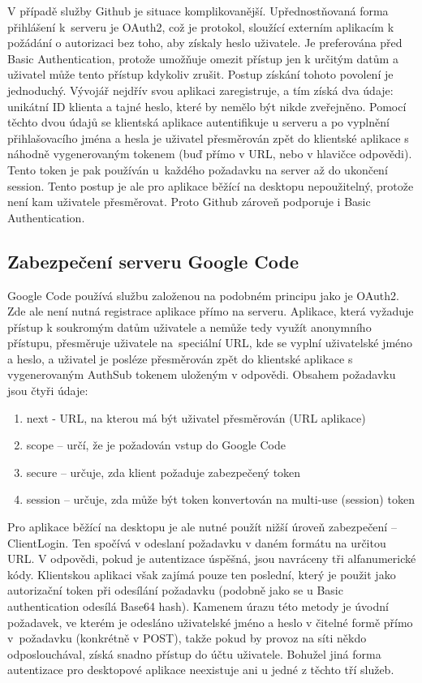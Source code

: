 V případě služby Github je situace komplikovanější\cite{github:summary}. Upřednostňovaná forma přihlášení k~serveru je OAuth2\cite{github:oauth}, což je protokol, sloužící externím aplikacím k požádání o autorizaci bez toho, aby získaly heslo uživatele. Je preferována před Basic Authentication, protože umožňuje omezit přístup jen k určitým datům a uživatel může tento přístup kdykoliv zrušit. Postup získání tohoto povolení je jednoduchý. Vývojář nejdřív svou aplikaci zaregistruje, a tím získá dva údaje: unikátní ID klienta a tajné heslo, které by nemělo být nikde zveřejněno. Pomocí těchto dvou údajů se klientská aplikace autentifikuje u serveru a po vyplnění přihlašovacího jména a hesla je uživatel přesměrován zpět do klientské aplikace s náhodně vygenerovaným tokenem (buď přímo v URL, nebo v hlavičce odpovědi). Tento token je pak používán u~každého požadavku na server až do ukončení session. Tento postup je ale pro aplikace běžící na desktopu nepoužitelný, protože není kam uživatele přesměrovat. Proto Github zároveň podporuje i Basic Authentication.

\subsection{Zabezpečení serveru Google Code}

Google Code používá službu\cite{googleauth} založenou na podobném principu jako je OAuth2. Zde ale není nutná registrace aplikace přímo na serveru. Aplikace, která vyžaduje přístup k soukromým datům uživatele a nemůže tedy využít anonymního přístupu, přesměruje uživatele na~speciální URL, kde se vyplní uživatelské jméno a heslo, a uživatel je posléze přesměrován zpět do klientské aplikace s vygenerovaným AuthSub tokenem uloženým v odpovědi. Obsahem požadavku jsou čtyři údaje:

\begin{enumerate}
\item next - URL, na kterou má být uživatel přesměrován (URL aplikace)
\item scope – určí, že je požadován vstup do Google Code
\item secure – určuje, zda klient požaduje zabezpečený token
\item session – určuje, zda může být token konvertován na multi-use (session) token
\end{enumerate}

Pro aplikace běžící na desktopu je ale nutné použít nižší úroveň zabezpečení – ClientLogin. Ten spočívá v odeslaní požadavku v daném formátu na určitou URL. V odpovědi, pokud je autentizace úspěšná, jsou navráceny tři alfanumerické kódy. Klientskou aplikaci však zajímá pouze ten poslední, který je použit jako autorizační token při odesílání požadavku (podobně jako se u Basic authentication odesílá Base64 hash). Kamenem úrazu této metody je úvodní požadavek, ve kterém je odesláno uživatelské jméno a heslo v čitelné formě přímo v~požadavku (konkrétně v POST), takže pokud by provoz na síti někdo odposlouchával, získá snadno přístup do účtu uživatele. Bohužel jiná forma autentizace pro desktopové aplikace neexistuje ani u jedné z těchto tří služeb.


